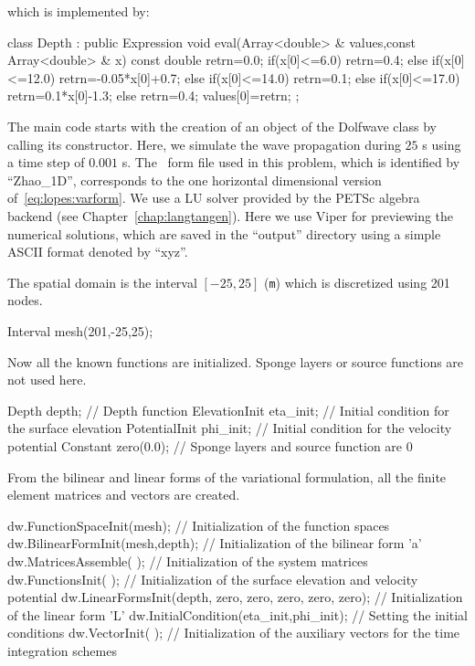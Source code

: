 which is implemented by:
\begin{c++}
class Depth :  public Expression
{
  void eval(Array<double> & values,const Array<double> & x) const
  {
    double retrn=0.0;
    if(x[0]<=6.0)
      retrn=0.4;
    else if(x[0]<=12.0)
      retrn=-0.05*x[0]+0.7;
    else if(x[0]<=14.0)
      retrn=0.1;
    else if(x[0]<=17.0)
      retrn=0.1*x[0]-1.3;
    else retrn=0.4;
    values[0]=retrn;
  }
};
\end{c++}
The main code starts with the creation of an object of the
Dolfwave class by calling its constructor.  Here, we simulate
the wave propagation during $25$ s using a time step of
$0.001$ s.  The \ufl\ form file used in this problem, which
is identified by ``Zhao\_1D'', corresponds to the one
horizontal dimensional version of~\eqref{eq:lopes:varform}.
We use a LU solver provided by the PETSc algebra backend
(see Chapter~\ref{chap:langtangen}).  Here we use Viper for
previewing the numerical solutions, which are saved in the
``output'' directory using a simple ASCII format denoted by
``xyz''.
\begin{c++}
int main( )
{
  Dolfwave dw(25000 /*Number of steps*/,
              0.001 /*Time step*/,
              "Zhao_1D" /*Variational form identifier*/,
              "LU_P" /*Linear solver type*/,
              "viper" /*Preview program*/,
              "output" /*Output directory*/,
              "xyz" /*File output format*/);
\end{c++}
The spatial domain is the interval $[-25,25]$ ({\tt m})
which is discretized using 201 nodes.
\begin{c++}
  Interval mesh(201,-25,25);
\end{c++}
Now all the known functions are initialized.  Sponge layers
or source functions are not used here.
\begin{c++}
  Depth depth; // Depth function
  ElevationInit eta_init; // Initial condition for the surface elevation
  PotentialInit phi_init;  // Initial condition for the velocity potential
  Constant zero(0.0); // Sponge layers and source function are 0
 \end{c++}
From the bilinear and linear forms of the variational
formulation, all the finite element matrices and vectors are created.
\begin{c++}
  dw.FunctionSpaceInit(mesh); // Initialization of the function spaces
  dw.BilinearFormInit(mesh,depth); // Initialization of the bilinear form 'a'
  dw.MatricesAssemble( ); // Initialization of the system matrices
  dw.FunctionsInit( ); // Initialization of the surface elevation and velocity potential
  dw.LinearFormsInit(depth, zero, zero, zero, zero, zero); // Initialization of the linear form 'L'
  dw.InitialCondition(eta_init,phi_init); // Setting the initial conditions
  dw.VectorInit( ); // Initialization of the auxiliary vectors for the time integration schemes
\end{c++}
